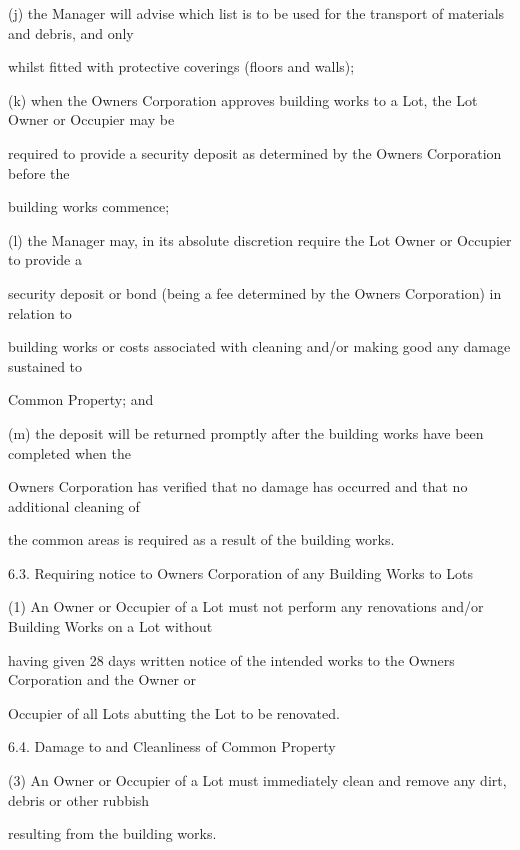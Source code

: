 \documentclass{article}
\begin{document}
{\fontsize{9.962}{1}(j) the Manager will advise which list is to be used for the transport of materials and debris, and only }

{\fontsize{10.02}{1}whilst fitted with protective coverings (floors and walls); }

{\fontsize{9.962}{1}(k) when the Owners Corporation approves building works to a Lot, the Lot Owner or Occupier may be }

{\fontsize{10.02}{1}required to provide a security deposit as determined by the Owners Corporation before the }

{\fontsize{10.02}{1}building works commence; }

{\fontsize{9.962}{1}(l) the Manager may, in its absolute discretion require the Lot Owner or Occupier to provide a }

{\fontsize{10.02}{1}security deposit or bond (being a fee determined by the Owners Corporation) in relation to }

{\fontsize{10.02}{1}building works or costs associated with cleaning and/or making good any damage sustained to }

{\fontsize{10.02}{1}Common Property; and }

{\fontsize{9.962}{1}(m) the deposit will be returned promptly after the building works have been completed when the }

{\fontsize{10.02}{1}Owners Corporation has verified that no damage has occurred and that no additional cleaning of }

{\fontsize{10.02}{1}the common areas is required as a result of the building works. }

{\fontsize{9.99}{1}6.3. Requiring notice to Owners Corporation of any Building Works to Lots }

{\fontsize{9.962}{1}(1) An Owner or Occupier of a Lot must not perform any renovations and/or Building Works on a Lot without }

{\fontsize{10.02}{1}having given 28 days written notice of the intended works to the Owners Corporation and the Owner or }

{\fontsize{10.02}{1}Occupier of all Lots abutting the Lot to be renovated. }

{\fontsize{9.99}{1}6.4. Damage to and Cleanliness of Common Property }

{\fontsize{9.962}{1}(3) An Owner or Occupier of a Lot must immediately clean and remove any dirt, debris or other rubbish }

{\fontsize{10.02}{1}resulting from the building works. }
\end{document}
